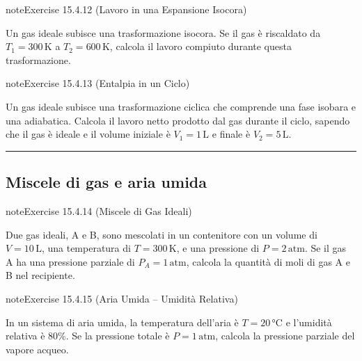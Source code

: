 \documentclass[letterpaper,10pt,italian]{jupyterBook}
\begin{document}
\begin{sphinxadmonition}{note}{Exercise 15.4.12 (Lavoro in una Espansione Isocora)}



\sphinxAtStartPar
Un gas ideale subisce una trasformazione isocora. Se il gas è riscaldato da \(T_1 = 300 \, \text{K}\) a \(T_2 = 600 \, \text{K}\), calcola il lavoro compiuto durante questa trasformazione.
\end{sphinxadmonition}
 \label{exercise:ch/thermodynamics/matter-problems-exercise-12}

\begin{sphinxadmonition}{note}{Exercise 15.4.13 (Entalpia in un Ciclo)}



\sphinxAtStartPar
Un gas ideale subisce una trasformazione ciclica che comprende una fase isobara e una adiabatica. Calcola il lavoro netto prodotto dal gas durante il ciclo, sapendo che il gas è ideale e il volume iniziale è \(V_1 = 1 \, \text{L}\) e finale è \(V_2 = 5 \, \text{L}\).
\end{sphinxadmonition}


\bigskip\hrule\bigskip



\subsection{Miscele di gas e aria umida}
\label{\detokenize{ch/thermodynamics/matter-problems:miscele-di-gas-e-aria-umida}} \label{exercise:ch/thermodynamics/matter-problems-exercise-13}

\begin{sphinxadmonition}{note}{Exercise 15.4.14 (Miscele di Gas Ideali)}



\sphinxAtStartPar
Due gas ideali, A e B, sono mescolati in un contenitore con un volume di \(V = 10 \, \text{L}\), una temperatura di \(T = 300 \, \text{K}\), e una pressione di \(P = 2 \, \text{atm}\). Se il gas A ha una pressione parziale di \(P_A = 1 \, \text{atm}\), calcola la quantità di moli di gas A e B nel recipiente.
\end{sphinxadmonition}
 \label{exercise:ch/thermodynamics/matter-problems-exercise-14}

\begin{sphinxadmonition}{note}{Exercise 15.4.15 (Aria Umida – Umidità Relativa)}



\sphinxAtStartPar
In un sistema di aria umida, la temperatura dell’aria è \(T = 20 \, \text{°C}\) e l’umidità relativa è \(80\%\). Se la pressione totale è \(P = 1 \, \text{atm}\), calcola la pressione parziale del vapore acqueo.
\end{sphinxadmonition}
 \label{exercise:ch/thermodynamics/matter-problems-exercise-15}
\end{document}
